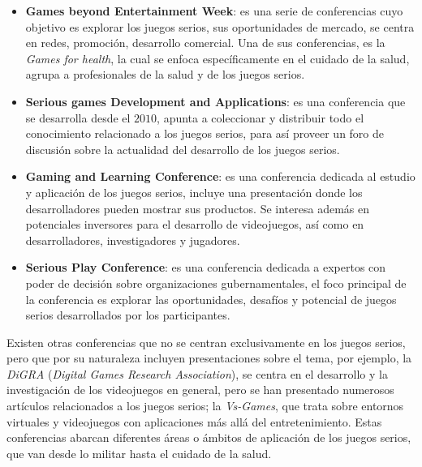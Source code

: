 \begin{itemize}
\item \textbf{Games beyond Entertainment Week}: es una serie de conferencias
    cuyo objetivo es explorar los juegos serios, sus oportunidades de mercado,
    se centra en redes, promoción, desarrollo comercial. Una de sus
    conferencias, es la \emph{Games for health}, la cual se enfoca
    específicamente en el cuidado de la salud, agrupa a profesionales de la
    salud y de los juegos serios\cite{games_beyond_entertainment}.
\item \textbf{Serious games Development and Applications}: es una conferencia
    que se desarrolla desde el $2010$, apunta a coleccionar y distribuir todo el
    conocimiento relacionado a los juegos serios, para así proveer un foro de
    discusión sobre la actualidad del desarrollo de los juegos
    serios\cite{sgda}.
\item \textbf{Gaming and Learning Conference}: es una conferencia dedicada al
    estudio y aplicación de los juegos serios, incluye una presentación donde
    los desarrolladores pueden mostrar sus productos. Se interesa además en
    potenciales inversores para el desarrollo de videojuegos, así como en 
    desarrolladores, investigadores y jugadores\cite{gala}.
\item \textbf{Serious Play Conference}: es una conferencia dedicada a expertos
    con poder de decisión sobre organizaciones gubernamentales, el foco
    principal de la conferencia es explorar las oportunidades, desafíos y
    potencial de juegos serios desarrollados por los
    participantes\cite{seriousplay}.
\end{itemize}

Existen otras conferencias que no se centran exclusivamente en los juegos
serios, pero que por su naturaleza incluyen presentaciones sobre el tema, por
ejemplo, la \emph{DiGRA} (\textit{Digital Games Research Association}), se
centra en el desarrollo y la investigación de los videojuegos en general, pero
se han presentado numerosos artículos relacionados a  los juegos serios; la
\emph{Vs-Games}, que trata sobre entornos virtuales y videojuegos con  aplicaciones
más allá del entretenimiento. Estas conferencias abarcan diferentes áreas o ámbitos de aplicación de los
juegos serios, que van desde lo militar hasta el cuidado de la salud.


